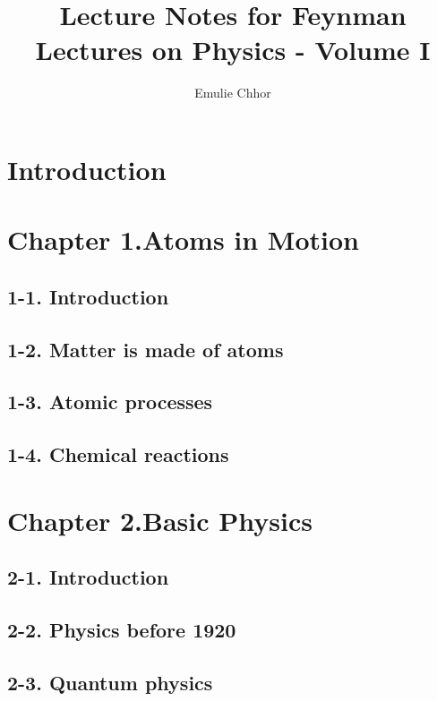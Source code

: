 \documentclass{article}
\begin{document}
\title{Lecture Notes for Feynman Lectures on Physics - Volume I}
\author{Emulie Chhor}
\maketitle

\section*{Introduction}

\newtheorem{definition}{Definition}[subsection]
\newtheorem{theorem}{Theorem}[subsection]
\newtheorem{corollary}{Corollary}[subsection]
\newtheorem{lemma}[theorem]{Lemma}
\newtheorem{proposition}{Proposition}[section]
\newtheorem{axiom}{Axiome}
\newtheorem{property}{Propriété}[subsection]
\newtheorem*{remark}{Remarque}
\newtheorem*{problem}{Problème}
\newtheorem*{intuition}{Intuition}

\section{Chapter 1.Atoms in Motion}
\subsection{1-1. Introduction}
\subsection{1-2. Matter is made of atoms}
\subsection{1-3. Atomic processes}
\subsection{1-4. Chemical reactions}
\section{Chapter 2.Basic Physics}
\subsection{2-1. Introduction}
\subsection{2-2. Physics before 1920}
\subsection{2-3. Quantum physics}
\end{document}
